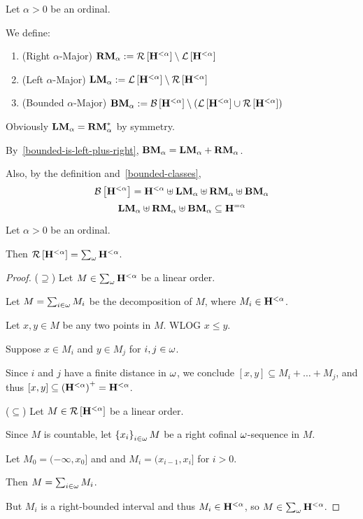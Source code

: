 \begin{definition}\label{bounded-definitions}
  Let $\alpha > 0$ be an ordinal.

  We define:
  \begin{enumerate}
    \item (Right $\alpha$-Major) $\mathbf{RM}_{\alpha} := \mathcal{R} \left[ {\mathbf{H}^{< \alpha}} \right] \setminus \mathcal{L} \left[ {\mathbf{H}^{< \alpha}} \right]$
    \item (Left $\alpha$-Major) $\mathbf{LM}_{\alpha} := \mathcal{L} \left[ {\mathbf{H}^{< \alpha}} \right] \setminus \mathcal{R} \left[ {\mathbf{H}^{< \alpha}} \right]$
    \item (Bounded $\alpha$-Major) $\mathbf{BM}_{\alpha} := \mathcal{B} \left[ {\mathbf{H}^{< \alpha}} \right] \setminus \left( { \mathcal{L} \left[ {\mathbf{H}^{< \alpha}} \right] \cup \mathcal{R} \left[ {\mathbf{H}^{< \alpha}} \right] } \right)$
  \end{enumerate}
\end{definition}

\begin{note}
  Obviously $\mathbf{LM}_{\alpha} = \mathbf{RM}_{\alpha}^\ast$ by symmetry.

  By~\cref{bounded-is-left-plus-right}, $\mathbf{BM}_{\alpha} = \mathbf{LM}_{\alpha} + \mathbf{RM}_{\alpha}$.

  Also, by the definition and~\cref{bounded-classes},
  \[
    \mathcal{B} \left[ {\mathbf{H}^{< \alpha}} \right] = \mathbf{H}^{< \alpha} \uplus \mathbf{LM}_{\alpha}
    \uplus \mathbf{RM}_{\alpha} \uplus \mathbf{BM}_{\alpha}
  \]
  \[
    \mathbf{LM}_{\alpha} \uplus \mathbf{RM}_{\alpha} \uplus \mathbf{BM}_{\alpha} \subseteq \mathbf{H}^{= \alpha}
  \]
\end{note}

\begin{lemma}\label{bounded-structure}
  Let $\alpha > 0$ be an ordinal.

  Then $\mathcal{R} \left[ {\mathbf{H}^{< \alpha}} \right] = \sum_{\omega}{\mathbf{H}^{< \alpha}}$.
\end{lemma}

\begin{proof}
  ($\supseteq$) Let $M \in \sum_{\omega}{\mathbf{H}^{< \alpha}}$ be a linear order.

  Let $M = \sum_{i \in \omega} M_i$ be the decomposition of $M$,
  where $M_i \in \mathbf{H}^{< \alpha}$.

  Let $x, y \in M$ be any two points in $M$. WLOG $x \le y$.

  Suppose $x \in M_i$ and $y \in M_j$ for $i, j \in \omega$.

  Since $i$ and $j$ have a finite distance in $\omega$,
  we conclude $[x, y] \subseteq M_i + \ldots + M_j$,
  and thus $[x, y] \subseteq \left( {\mathbf{H}^{< \alpha}} \right)^+ = \mathbf{H}^{< \alpha}$.

  ($\subseteq$) Let $M \in \mathcal{R} \left[ {\mathbf{H}^{< \alpha}} \right]$ be a linear order.

  Since $M$ is countable, let $\left\{ {x_i} \right\}_{i \in \omega} M$ be a right cofinal
  $\omega$-sequence in $M$.

  Let $M_0 = (-\infty, x_0]$ and and $M_i = (x_{i-1}, x_{i}]$ for $i > 0$.

  Then $M = \sum_{i \in \omega} M_i$.

  But $M_i$ is a right-bounded interval and thus $M_i \in \mathbf{H}^{< \alpha}$, so $M \in \sum_{\omega}{\mathbf{H}^{< \alpha}}$.
\end{proof}

